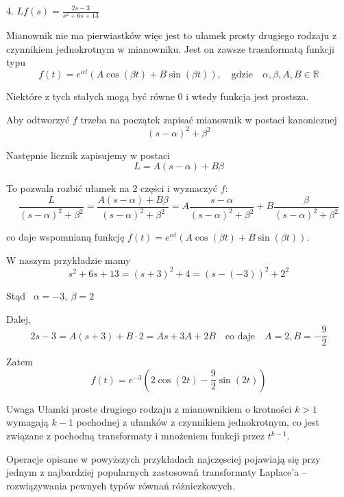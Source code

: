 \begin{przykladbig}
    4. $ Lf(s) = \frac{2s - 3}{s^2 + 6s + 13} $

    Mianownik nie ma pierwiastków więc jest to ułamek prosty drugiego rodzaju z czynnikiem jednokrotnym w mianowniku. Jest on zawsze trasnformatą funkcji typu
    \[ f(t) = e^{\alpha t} (A \cos (\beta t) + B \sin (\beta t)), \quad \text{gdzie} \quad \alpha, \beta, A, B \in \mathbb{R} \]

    Niektóre z tych stałych mogą być równe 0 i wtedy funkcja jest prostsza.

    Aby odtworzyć $f$ trzeba na początek zapisać mianownik w postaci kanonicznej
    \[ (s - \alpha)^2 + \beta^2 \]

    Następnie licznik zapisujemy w postaci
    \[ L = A(s - \alpha) + B \beta \]
    
    To pozwala rozbić ułamek na 2 części i wyznaczyć $f$:
    \[ \frac{L}{(s - \alpha)^2 + \beta^2} = \frac{A(s - \alpha) + B \beta}{(s - \alpha)^2 + \beta^2} = A \frac{s - \alpha}{(s - \alpha)^2 + \beta^2} + B \frac{\beta}{(s - \alpha)^2 + \beta^2} \]

    co daje wspomnianą funkcję $ f(t) = e^{\alpha t} (A \cos (\beta t) + B \sin (\beta t)) $.
    
    W naszym przykładzie mamy 
    \[ s^2 + 6s + 13 = (s+3)^2 + 4 = (s - (-3))^2 + 2^2 \]
    
    Stąd \ $ \alpha = -3, \ \beta = 2 $

    Dalej,
    \[ 2s - 3 = A(s + 3) + B \cdot 2 = As + 3A + 2B \quad \text{co daje} \quad A = 2, B = -\frac{9}{2} \]
    
    Zatem 
    \[ f(t) = e^{-3}\left( 2 \cos(2t) - \frac{9}{2} \sin(2t) \right) \]
\end{przykladbig}

\begin{blad}{Uwaga}
    Ułamki proste drugiego rodzaju z mianownikiem o krotności $k > 1$ wymagają $ k - 1 $ pochodnej z ułamków z czynnikiem jednokrotnym, co jest
    związane z pochodną transformaty i mnożeniem funkcji przez $ t^{k -1}$.
\end{blad}

Operacje opisane w powyższych przykładach najczęsciej pojawiają się przy jednym z najbardziej popularnych zastosowań transformaty Laplace'a -- rozwiązywania pewnych typów równań różniczkowych.
